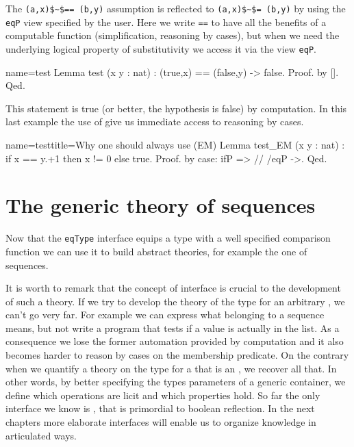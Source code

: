 The \lstinline/(a,x)$~$== (b,y)/ assumption is reflected to
\lstinline/(a,x)$~$= (b,y)/ by using the \lstinline/eqP/ view
specified by the user.  Here we write \lstinline/==/ to have
all the benefits of a computable function (simplification, reasoning
by cases), but when we need the underlying logical property of
substitutivity we access it via the view \lstinline/eqP/.

\begin{coq}{name=test}{}
Lemma test (x y : nat) : (true,x) == (false,y) -> false.
Proof. by []. Qed.
\end{coq}

This statement is true (or better, the hypothesis is false) by computation.
In this last example the use of \C{==} give us immediate access to
reasoning by cases.

\begin{coq}{name=test}{title=Why one should always use \C{==} (EM)}
Lemma test_EM (x y : nat) : if x == y.+1 then x != 0 else true.
Proof. by case: ifP => // /eqP  ->. Qed.
\end{coq}




\section{The generic theory of sequences}\label{sec:seqtypetheory}

Now that the \lstinline/eqType/ interface equips a type with a well
specified comparison function we can use it to build abstract theories,
for example the one of sequences.

It is worth to remark that the concept of interface is crucial to
the development of such a theory. If we try to develop the theory
of the type  for an arbitrary , we can't go very far.
For example we can express what belonging to a sequence means, but
not write a program that tests if a value is actually in the list.  As a
consequence we lose the former automation provided by computation
and it also becomes harder to reason by cases on the membership predicate.
On the contrary when we quantify a theory on the type   for a
 that is an , we recover all that.  In other words,
by better specifying the types parameters of a generic container,
we define which operations are licit and which properties hold.
So far the only interface we know is , that is primordial to
boolean reflection.
In the next chapters more elaborate interfaces will enable us to
organize knowledge in articulated ways.

